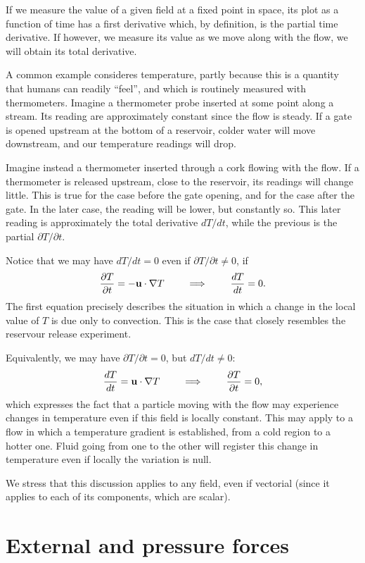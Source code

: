 If we measure the value of a given field at a fixed point in space,
its plot as a function of time has a first derivative which, by
definition, is the partial time derivative. If however, we measure
its value as we move along with the flow, we will obtain its total
derivative.

A common example consideres temperature, partly because this is a
quantity that humans can readily ``feel'', and which is routinely
measured with thermometers. Imagine a thermometer probe inserted at
some point along a stream. Its reading are approximately constant
since the flow is steady. If a gate is opened upstream at the bottom
of a reservoir, colder water will move downstream, and our temperature
readings will drop.

Imagine instead a thermometer inserted through a cork flowing with the
flow. If a thermometer is released upstream, close to the reservoir,
its readings will change little. This is true for the case before the
gate opening, and for the case after the gate. In the later case, the
reading will be lower, but constantly so. This later reading is
approximately the total derivative $dT/dt$, while the previous is the
partial $\partial T / \partial t$.

Notice that we may have $dT/dt = 0$ even if $\partial T / \partial t
\ne 0$, if
\[
\frac{\partial T }{ \partial t} = - \mathbf{u} \cdot \nabla T
\qquad\implies\qquad
\frac{d T }{d t} = 0 .
\]
The first equation precisely describes the situation in which a change
in the local value of $T$ is due only to convection. This is the
case that closely resembles the reservour release experiment.

Equivalently, we may have $\partial T / \partial t = 0$, but $dT/dt
\ne 0$:
\[
\frac{d T }{d t} = \mathbf{u} \cdot \nabla T
\qquad\implies\qquad
\frac{\partial T }{\partial t} = 0 ,
\]
which expresses the fact that a particle moving with the flow may
experience changes in temperature even if this field is locally
constant. This may apply to a flow in which a temperature gradient is
established, from a cold region to a hotter one. Fluid going from one
to the other will register this change in temperature even if
locally the variation is null.

We stress that this discussion applies to any field, even if vectorial
(since it applies to each of its components, which are scalar).



\section{External and pressure forces}

